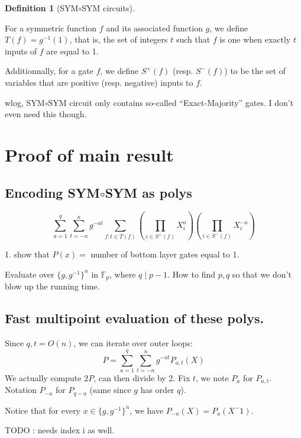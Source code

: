 \documentclass[a4paper, 11pt]{article}
\theoremstyle{plain}
\theoremstyle{definition}
\newtheorem{definition}[theorem]{Definition}
\theoremstyle{remark}
\newcommand{\FF}{\mathbb{F}}%
\newcommand{\ssym}{\textsf{SYM$\circ$SYM}}%
\begin{document}
\begin{definition}[\ssym{} circuits]
\end{definition}

For a symmetric function $f$ and its associated function $g$, we define $T(f) = g^{-1}(1)$,
that is, the set of integers $t$ such that $f$ is one when exactly $t$ inputs of $f$ are equal to 1.

Additionnally, for a gate $f$, we define $S^+(f)$ (resp. $S^-(f)$)
to be the set of variables that are positive (resp. negative) inputs to $f$.


wlog, \ssym{} circuit only contains so-called ``Exact-Majority'' gates.
I don't even need this though.

\section{Proof of main result}

\subsection{Encoding \ssym{} as polys}
\[\sum_{a = 1}^q \sum_{t = -n}^n g^{-at} \sum_{f : t\in T(f)} (\prod_{i \in S^+(f)} X_i^a) (\prod_{i \in S^-(f)} X_i^{-a})\]

1. show that $P(x) = $ number of bottom layer gates equal to 1.

Evaluate over $\{g, g^{-1}\}^n$ in $\FF_p$, where $q\mid p-1$.
How to find $p,q$ so that we don't blow up the running time.



\subsection{Fast multipoint evaluation of these polys.}
Since $q, t = O(n)$, we can iterate over outer loops:
\[ P = \sum_{a = 1}^q \sum_{t = -n}^n g^{-at} P_{a,t}(X)\]
We actually compute $2P$, can then divide by 2.
Fix $t$, we note $P_a$ for $P_{a,t}$.
Notation $P_{-a}$ for $P_{q-a}$ (same since $g$ has order $q$).

Notice that for every $x\in \{g, g^{-1}\}^n$, we have $P_{-a}(X) = P_{a}(X^-1)$. 

TODO : needs index i as well.


\end{document}
